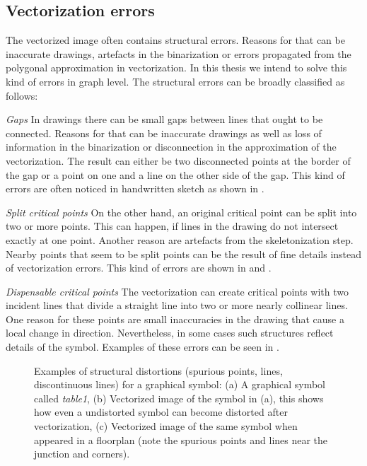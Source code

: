 \subsection{Vectorization errors}
\label{ssec:gm:vect-errors}
The vectorized image often contains structural errors. Reasons for that can be inaccurate drawings, artefacts in the binarization or errors propagated from the polygonal approximation in vectorization. In this thesis we intend to solve this kind of errors in graph level. The structural errors can be broadly classified as follows:

\textit{Gaps} In drawings there can be small gaps between lines that ought to be connected. Reasons for that can be inaccurate drawings as well as loss of information in the binarization or disconnection in the approximation of the vectorization. The result can either be two disconnected points at the border of the gap or a point on one and a line on the other side of the gap. This kind of errors are often noticed in handwritten sketch as shown in .

\textit{Split critical points} On the other hand, an original critical point can be split into two or more points. This can happen, if lines in the drawing do not intersect exactly at one point. Another reason are artefacts from the skeletonization step. Nearby points that seem to be split points can be the result of fine details instead of vectorization errors. This kind of errors are shown in  and .

\textit{Dispensable critical points} The vectorization can create critical points with two incident lines that divide a straight line into two or more nearly collinear lines. One reason for these points are small inaccuracies in the drawing that cause a local change in direction. Nevertheless, in some cases such structures reflect details of the symbol. Examples of these errors can be seen in .

\begin{figure}[!h]
\centering
{}
\hspace{1mm}
\hspace{1mm}  
\caption{Examples of structural distortions (spurious points, lines, discontinuous lines) for a graphical symbol: (a) A graphical symbol called \emph{table1}, (b) Vectorized image of the symbol in (a), this shows how even a undistorted symbol can become distorted after vectorization, (c) Vectorized image of the same symbol when appeared in a floorplan (note the spurious points and lines near the junction and corners).}
\label{fig:gm:vect-err2}
\end{figure}

